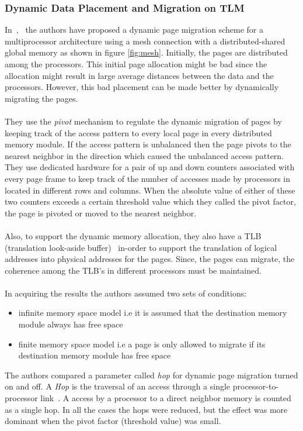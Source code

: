 \documentclass{listhesis}
\begin{document}
\subsubsection{Dynamic Data Placement and Migration on TLM}
In~\cite{dynamicPageMigration},~\cite{dynamicpMigration} the authors have proposed a dynamic page migration scheme for a multiprocessor architecture using a mesh connection with a distributed-shared global memory as shown in figure \ref{fig:mesh}. Initially, the pages are distributed among the processors. This initial page allocation might be bad since the allocation might result in large average distances between the data and the processors. However, this bad placement can be made better by dynamically migrating the pages.\\
\\
They use the \textit{pivot} mechanism to regulate the dynamic migration of pages by keeping track of the access pattern to every local page in every distributed memory module. If the access pattern is unbalanced then the page pivots to the nearest neighbor in the direction which caused the unbalanced access pattern. They use dedicated hardware for a pair of up and down counters associated with every page frame to keep track of the number of accesses made by processors in located in different rows and columns. When the absolute value of either of these two counters exceeds a certain threshold value which they called the pivot factor, the page is pivoted or moved to the nearest neighbor.\\
\\
Also, to support the dynamic memory allocation, they also have a TLB (translation look-aside buffer)~\cite{tlb} in-order to support the translation of logical addresses into physical addresses for the pages. Since, the pages can migrate, the coherence among the TLB's in different processors must be maintained.\\
\\
In acquiring the results the authors assumed two sets of conditions:
\begin{itemize}
	\item infinite memory space model i.e it is assumed that the destination memory module always has free space
	\item finite memory space model i.e a page is only allowed to migrate if its destination memory module has free space
\end{itemize}
The authors compared a parameter called \textit{hop} for dynamic page migration turned on and off. A \textit{Hop} is the traversal of an access through a single processor-to-processor link~\cite{dynamicPageMigration}. A access by a processor to a direct neighbor memory is counted as a single hop. In all the cases the hops were reduced, but the effect was more dominant when the pivot factor (threshold value) was small.\\
\end{document}
